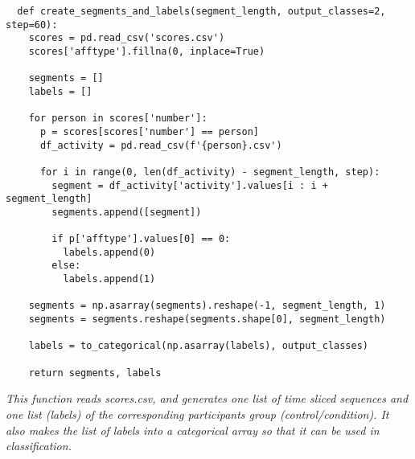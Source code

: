 \begin{code}
  \begin{verbatim}
  def create_segments_and_labels(segment_length, output_classes=2, step=60):
    scores = pd.read_csv('scores.csv')
    scores['afftype'].fillna(0, inplace=True)
    
    segments = []
    labels = []

    for person in scores['number']:
      p = scores[scores['number'] == person]
      df_activity = pd.read_csv(f'{person}.csv')

      for i in range(0, len(df_activity) - segment_length, step):
        segment = df_activity['activity'].values[i : i + segment_length]
        segments.append([segment])

        if p['afftype'].values[0] == 0: 
          labels.append(0)
        else:
          labels.append(1)

    segments = np.asarray(segments).reshape(-1, segment_length, 1)
    segments = segments.reshape(segments.shape[0], segment_length)

    labels = to_categorical(np.asarray(labels), output_classes)
    
    return segments, labels
  \end{verbatim}
  \caption{\textit{This function reads scores.csv, and generates one list of time sliced sequences and one list (labels) of the corresponding participants group (control/condition). It also makes the list of labels into a categorical array so that it can be used in classification.}}
  \label{code:reading_dataset}
\end{code}
